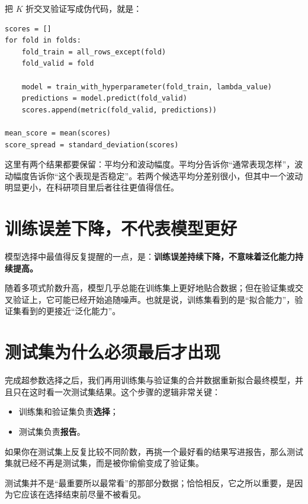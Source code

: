 把 $K$ 折交叉验证写成伪代码，就是：

\begin{examplebox}[K 折交叉验证骨架]
\begin{lstlisting}[style=pythonstyle]
scores = []
for fold in folds:
    fold_train = all_rows_except(fold)
    fold_valid = fold

    model = train_with_hyperparameter(fold_train, lambda_value)
    predictions = model.predict(fold_valid)
    scores.append(metric(fold_valid, predictions))

mean_score = mean(scores)
score_spread = standard_deviation(scores)
\end{lstlisting}
\end{examplebox}

这里有两个结果都要保留：平均分和波动幅度。平均分告诉你“通常表现怎样”，波动幅度告诉你“这个表现是否稳定”。若两个候选平均分差别很小，但其中一个波动明显更小，在科研项目里后者往往更值得信任。

\section{训练误差下降，不代表模型更好}

模型选择中最值得反复提醒的一点，是：\textbf{训练误差持续下降，不意味着泛化能力持续提高。}

随着多项式阶数升高，模型几乎总能在训练集上更好地贴合数据；但在验证集或交叉验证上，它可能已经开始追随噪声。也就是说，训练集看到的是“拟合能力”，验证集看到的更接近“泛化能力”。

\section{测试集为什么必须最后才出现}

完成超参数选择之后，我们再用训练集与验证集的合并数据重新拟合最终模型，并且只在这时看一次测试集结果。这个步骤的逻辑非常关键：

\begin{itemize}
    \item 训练集和验证集负责\textbf{选择}；
    \item 测试集负责\textbf{报告}。
\end{itemize}

如果你在测试集上反复比较不同阶数，再挑一个最好看的结果写进报告，那么测试集就已经不再是测试集，而是被你偷偷变成了验证集。

\begin{protip}[测试集最重要的属性是独立性]
测试集并不是“最重要所以最常看”的那部分数据；恰恰相反，它之所以重要，是因为它应该在选择结束前尽量不被看见。
\end{protip}

